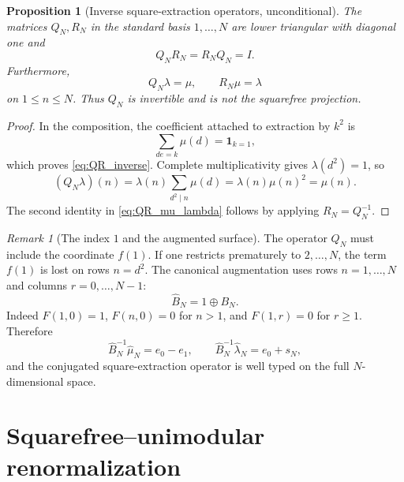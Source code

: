 \documentclass[11pt]{amsart}
\numberwithin{equation}{section}
\theoremstyle{plain}
\newtheorem{proposition}[theorem]{Proposition}
\theoremstyle{definition}
\theoremstyle{remark}
\newtheorem{remark}[theorem]{Remark}
\newcommand{\one}{\mathbf 1}
\newcommand{\mob}{\mu}
\newcommand{\liou}{\lambda}
\begin{document}
\begin{proposition}[Inverse square-extraction operators, unconditional]
\label{prop:QR_inverse}
The matrices $Q_N,R_N$ in the standard basis $1,\ldots,N$ are lower triangular with diagonal one and
\begin{equation}
Q_NR_N=R_NQ_N=I.
\label{eq:QR_inverse}
\end{equation}
Furthermore,
\begin{equation}
Q_N\liou=\mob,
\qquad
R_N\mob=\liou
\label{eq:QR_mu_lambda}
\end{equation}
on $1\le n\le N$.  Thus $Q_N$ is invertible and is not the squarefree projection.
\end{proposition}

\begin{proof}
In the composition, the coefficient attached to extraction by $k^2$ is
\begin{equation}
\sum_{de=k}\mob(d)=\one_{k=1},
\label{eq:QR_coefficient}
\end{equation}
which proves \eqref{eq:QR_inverse}.  Complete multiplicativity gives $\liou(d^2)=1$, so
\begin{equation}
(Q_N\liou)(n)=\liou(n)\sum_{d^2\mid n}\mob(d)=\liou(n)\mob(n)^2=\mob(n).
\label{eq:Q_lambda_mu_proof}
\end{equation}
The second identity in \eqref{eq:QR_mu_lambda} follows by applying $R_N=Q_N^{-1}$.
\end{proof}

\begin{remark}[The index $1$ and the augmented surface]
\label{rem:augmented_surface}
The operator $Q_N$ must include the coordinate $f(1)$.  If one restricts prematurely to $2,\ldots,N$, the term $f(1)$ is lost on rows $n=d^2$.  The canonical augmentation uses rows $n=1,\ldots,N$ and columns $r=0,\ldots,N-1$:
\begin{equation}
\widehat B_N=1\oplus B_N.
\label{eq:augmented_B}
\end{equation}
Indeed $F(1,0)=1$, $F(n,0)=0$ for $n>1$, and $F(1,r)=0$ for $r\ge1$.  Therefore
\begin{equation}
\widehat B_N^{-1}\widehat\mob_N=e_0-e_1,
\qquad
\widehat B_N^{-1}\widehat\liou_N=e_0+s_N,
\label{eq:augmented_coordinates}
\end{equation}
and the conjugated square-extraction operator is well typed on the full $N$-dimensional space.
\end{remark}

\section{Squarefree--unimodular renormalization}
\label{sec:unimodular_renormalization}
\end{document}
